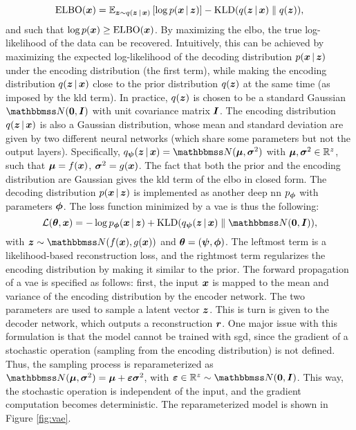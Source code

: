$$\Fun{ELBO}(\Vector{x}) = \Expectation{\Vector{z} \sim q(\Vector{z} \given \Vector{x})}{\log p(\Vector{x} \given \Vector{z})} - \KLD{q(\Vector{z} \given \Vector{x})}{q(\Vector{z})},$$
and such that $\log p(\Vector{x}) \geq \Fun{ELBO}(\Vector{x})$. By maximizing the \gls{elbo}, the true log-likelihood of the data can be recovered. Intuitively, this can be achieved by maximizing the expected log-likelihood of the decoding distribution $p(\Vector{x} \given \Vector{z})$ under the encoding distribution (the first term), while making the encoding distribution $q(\Vector{z} \given \Vector{x})$ close to the prior distribution $q(\Vector{z})$ at the same time (as imposed by the \gls{kld} term). In practice, $q(\Vector{z})$ is chosen to be a standard Gaussian $\Normal{\Zeros}{\Identity}$ with unit covariance matrix $\Identity$. The encoding distribution $q(\Vector{z} \given \Vector{x})$ is also a Gaussian distribution, whose mean and standard deviation are given by two different neural networks (which share some parameters but not the output layers). Specifically,
$\Encoder(\Vector{z} \given \Vector{x}) = \Normal{\MeanVec}{\StdVec}$ with $\boldsymbol{\mu},\boldsymbol{\sigma}^2 \in \mathbb{R}^z$, such that $\MeanVec = f(\Vector{x})$, $\StdVec = g(\Vector{x})$. The fact that both the prior and the encoding distribution are Gaussian gives the \gls{kld} term of the \gls{elbo} in closed form. The decoding distribution $p(\Vector{x} \given \Vector{z})$ is implemented as another deep \gls{nn} $p_{\boldsymbol{\phi}}$ with parameters $\boldsymbol{\phi}$. The loss function minimized by a \gls{vae} is thus the following:
$$\Loss(\Param, \Vector{x}) = - \log \Decoder(\Vector{x} \given \Vector{z}) + \KLD{\Encoder(\Vector{z} \given \Vector{x})}{\Normal{\Zeros}{\Identity}},$$
with $\Vector{z} \sim \Normal{f(\Vector{x})}{g(\Vector{x})}$ and $\boldsymbol{\theta} = (\boldsymbol{\psi},\boldsymbol{\phi})$. The leftmost term is a likelihood-based reconstruction loss, and the rightmost term regularizes the encoding distribution by making it similar to the prior. The forward propagation of a \gls{vae} is specified as follows: first, the input $\Vector{x}$ is mapped to the mean and variance of the encoding distribution by the encoder network. The two parameters are used to sample a latent vector $\Vector{z}$. This is turn is given to the decoder network, which outputs a reconstruction $\Vector{r}$. One major issue with this formulation is that the model cannot be trained with \gls{sgd}, since the gradient of a stochastic operation (sampling from the encoding distribution) is not defined. Thus, the sampling process is reparameterized as $\Normal{\MeanVec}{\StdVec} = \MeanVec + \boldsymbol{\eps}\StdVec$, with $\boldsymbol{\eps} \in \Real^z \sim \Normal{\Zeros}{\Identity}$. This way, the stochastic operation is independent of the input, and the gradient computation becomes deterministic. The reparameterized model is shown in Figure \ref{fig:vae}.
